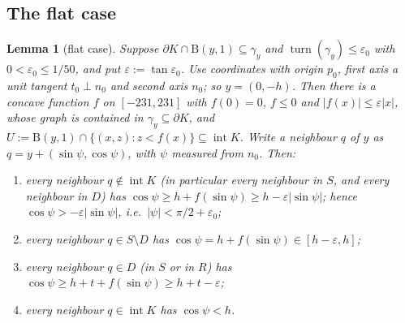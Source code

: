 \documentclass[11pt]{amsart}
\newtheorem{lemma}[theorem]{Lemma}
\theoremstyle{definition}
\theoremstyle{remark}
\newcommand{\eps}{\varepsilon}
\newcommand{\turn}{\operatorname{turn}}
\newcommand{\Dd}{\mathrm{B}}      %
\begin{document}
\subsection{The flat case}
\begin{lemma}[flat case]\label{lem:flat}
Suppose $\partial K\cap\Dd(y,1)\subseteq\gamma_y$ and $\turn(\gamma_y)\le\eps_0$ with $0<\eps_0\le1/50$, and put $\eps:=\tan\eps_0$. Use coordinates with origin $p_0$, first axis a unit tangent $t_0\perp n_0$ and second axis $n_0$; so $y=(0,-h)$. Then there is a concave function $f$ on $[-231,231]$ with $f(0)=0$, $f\le0$ and $|f(x)|\le\eps|x|$, whose graph is contained in $\gamma_y\subseteq\partial K$, and $U:=\Dd(y,1)\cap\{(x,z):z<f(x)\}\subseteq\operatorname{int}K$. Write a neighbour $q$ of $y$ as $q=y+(\sin\psi,\cos\psi)$, with $\psi$ measured from $n_0$. Then:
\begin{enumerate}[label=\textup{(F\arabic*)},leftmargin=3em]
\item every neighbour $q\notin\operatorname{int}K$ (in particular every neighbour in $S$, and every neighbour in $D$) has $\cos\psi\ge h+f(\sin\psi)\ge h-\eps|\sin\psi|$; hence $\cos\psi>-\eps|\sin\psi|$, i.e.\ $|\psi|<\pi/2+\eps_0$;
\item every neighbour $q\in S\setminus D$ has $\cos\psi=h+f(\sin\psi)\in[h-\eps,h]$;
\item every neighbour $q\in D$ (in $S$ or in $R$) has $\cos\psi\ge h+t+f(\sin\psi)\ge h+t-\eps$;
\item every neighbour $q\in\operatorname{int}K$ has $\cos\psi<h$.
\end{enumerate}
\end{lemma}
\end{document}
